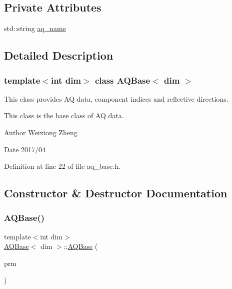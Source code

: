 \subsection*{Private Attributes}
\begin{DoxyCompactItemize}
\item 
std\+::string \hyperlink{class_a_q_base_a3e50d2d59d1a4a2fabed3c4852f80c49}{aq\+\_\+name}
\end{DoxyCompactItemize}


\subsection{Detailed Description}
\subsubsection*{template$<$int dim$>$\newline
class A\+Q\+Base$<$ dim $>$}

This class provides AQ data, component indices and reflective directions. 

This class is the base class of AQ data.

\begin{DoxyAuthor}{Author}
Weixiong Zheng 
\end{DoxyAuthor}
\begin{DoxyDate}{Date}
2017/04 
\end{DoxyDate}


Definition at line 22 of file aq\+\_\+base.\+h.



\subsection{Constructor \& Destructor Documentation}
\mbox{\label{class_a_q_base_a3a05ceb6b201b4e6e605b260d766842d}} 
\subsubsection{\texorpdfstring{A\+Q\+Base()}{AQBase()}}
{\footnotesize\ttfamily template$<$int dim$>$ \\
\hyperlink{class_a_q_base}{A\+Q\+Base}$<$ dim $>$\+::\hyperlink{class_a_q_base}{A\+Q\+Base} (\begin{DoxyParamCaption}\item[{Parameter\+Handler \&}]{prm }\end{DoxyParamCaption})}

